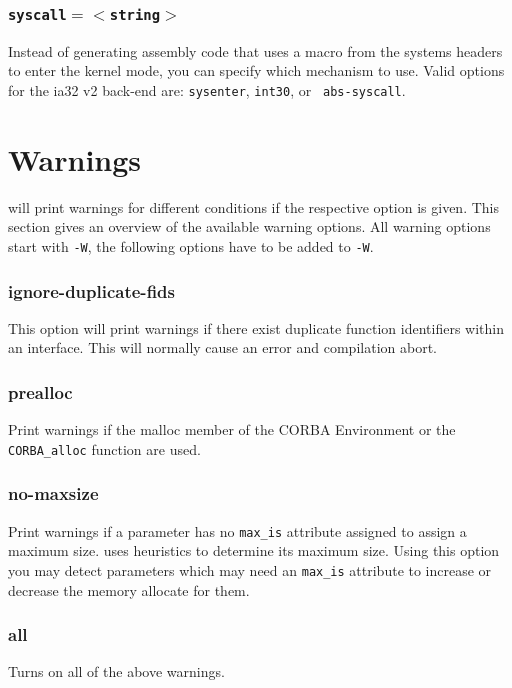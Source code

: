 \subsubsection{\tt syscall$=<$string$>$}
Instead of generating assembly code that uses a macro from the systems headers
to enter the kernel mode, you can specify which mechanism to use. Valid
options for the ia32 v2 back-end are: {\tt sysenter}, {\tt int30}, or {\tt
abs-syscall}.

\section{Warnings}
\dice{} will print warnings for different conditions if the respective
option is given. This section gives an overview of the available warning
options. All warning options start with \verb|-W|, the following options
have to be added to \verb|-W|.

\subsubsection{ignore-duplicate-fids}
This option will print warnings if there exist duplicate function identifiers
within an interface. This will normally cause an error and compilation 
abort.

\subsubsection{prealloc}
Print warnings if the malloc member of the CORBA Environment or the
\verb|CORBA_alloc| function are used.

\subsubsection{no-maxsize}
Print warnings if a parameter has no \verb|max_is| attribute assigned
to assign a maximum size. \dice{} uses heuristics to determine its
maximum size. Using this option you may detect parameters which may
need an \verb|max_is| attribute to increase or decrease the memory
allocate for them.

\subsubsection{all}
Turns on all of the above warnings.

